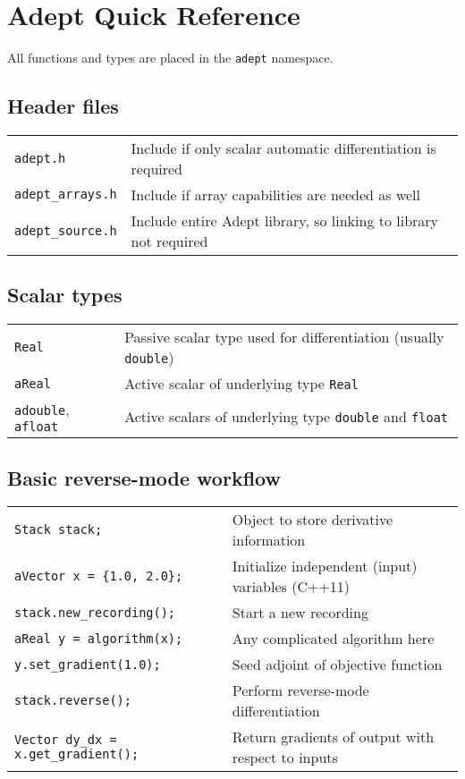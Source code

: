 \documentclass[10pt,a4,landscape]{article}
\def\myfont{\fontfamily{cmss}\fontseries{lmtt}\selectfont}
\def\mysize{\footnotesize}
\def\mysize{\small}
\def\code#1{\texttt{#1}}
\begin{document}
\pagestyle{empty}
\twocolumn
\mysize\myfont\section*{\Huge Adept Quick Reference}
All functions and types are placed in the \code{adept} namespace.
\subsection*{Header files}
\begin{tabular}{ll}
\code{adept.h} & Include if only scalar automatic differentiation is required\\
\code{adept\_arrays.h} & Include if array capabilities are needed as well\\
\code{adept\_source.h} & Include entire Adept library, so linking to library not required \\
\end{tabular}

\subsection*{Scalar types}
\begin{tabular}{ll}
\code{Real} & Passive scalar type used for differentiation (usually
\code{double})\\
\code{aReal} & Active scalar of underlying type \code{Real} \\
\code{adouble}, \code{afloat} & Active scalars of underlying type
\code{double} and \code{float}\\
\end{tabular}
\subsection*{Basic reverse-mode workflow}
\begin{tabular}{ll}
\code{Stack stack;} & Object to store derivative information\\
\code{aVector x = \{1.0, 2.0\};} & Initialize independent (input) variables (C++11)\\
\code{stack.new\_recording();} & Start a new recording\\
\code{aReal y = algorithm(x);} & Any complicated algorithm here\\
\code{y.set\_gradient(1.0);} & Seed adjoint of objective function\\
\code{stack.reverse();} & Perform reverse-mode differentiation\\
\code{Vector dy\_dx = x.get\_gradient();} & Return gradients of output with respect to inputs\\
\end{tabular}
\end{document}

